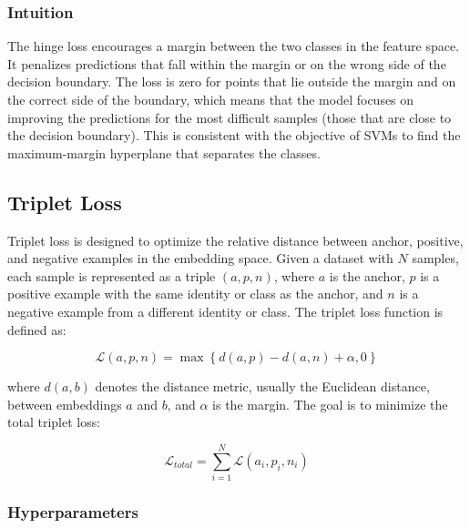 \documentclass[12pt]{article}
\begin{document}
\subsubsection{Intuition}

The hinge loss encourages a margin between the two classes in the feature space. It penalizes predictions that fall within the margin or on the wrong side of the decision boundary. The loss is zero for points that lie outside the margin and on the correct side of the boundary, which means that the model focuses on improving the predictions for the most difficult samples (those that are close to the decision boundary). This is consistent with the objective of SVMs to find the maximum-margin hyperplane that separates the classes.

\subsection{Triplet Loss}

Triplet loss is designed to optimize the relative distance between anchor, positive, and negative examples in the embedding space. Given a dataset with $N$ samples, each sample is represented as a triple $(a, p, n)$, where $a$ is the anchor, $p$ is a positive example with the same identity or class as the anchor, and $n$ is a negative example from a different identity or class. The triplet loss function is defined as:

\begin{equation}
\mathcal{L}(a, p, n) = \max\left\{d(a, p) - d(a, n) + \alpha, 0\right\}
\end{equation}

where $d(a, b)$ denotes the distance metric, usually the Euclidean distance, between embeddings $a$ and $b$, and $\alpha$ is the margin. The goal is to minimize the total triplet loss:

\begin{equation}
\mathcal{L}_{total} = \sum_{i=1}^{N} \mathcal{L}(a_i, p_i, n_i)
\end{equation}

\subsubsection{Hyperparameters}
\end{document}

